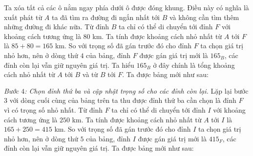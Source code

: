 \begin{multicols}{2}
	\vskip 0.1cm
	Ta xóa tất cả các ô nằm ngay phía dưới ô được đóng khung. Điều này có nghĩa là xuất phát từ $A$ ta đã tìm ra đường đi ngắn nhất tới $B$ và không cần tìm thêm những đường đi khác nữa. 
	\vskip 0.1cm
	Từ đỉnh $B$ ta chỉ có thể di chuyển tới đỉnh $F$ với khoảng cách tương ứng là $80$ km. Ta tính được khoảng cách nhỏ nhất từ $A$ tới $F$ là $85+80=165$ km. So với trọng số đã gán trước đó cho đỉnh $F$ ta chọn giá trị nhỏ hơn, nên ở dòng thứ $4$ của bảng, đỉnh $F$ được gán giá trị mới là $165_B$, các đỉnh còn lại vẫn giữ nguyên giá trị. Ta hiểu $165_B$ ở đây chính là tổng khoảng cách nhỏ nhất từ $A$ tới $B$ và từ $B$ tới $F$.
	\vskip 0.1cm 
	Ta được bảng mới như sau: 
	\begin{table}[H]
		\vspace*{-5pt}
		\centering
		\captionsetup{labelformat= empty, justification=centering}
		\vspace*{-10pt}
	\end{table}
	\textit{Bước $4$: Chọn đỉnh thứ ba và cập nhật trọng số cho các đỉnh còn lại.}  Lặp lại bước $3$ với dòng cuối cùng của bảng trên ta thu được đỉnh thứ ba cần chọn là đỉnh $F$ vì có trọng số nhỏ nhất. Từ đỉnh $F$ ta chỉ có thể di chuyển tới đỉnh $I$ với khoảng cách tương ứng là $250$ km. Ta tính được khoảng cách nhỏ nhất từ $A$ tới $I$ là $165+250=415$ km. So với trọng số đã gán trước đó cho đỉnh $I$ ta chọn giá trị nhỏ hơn, nên ở dòng thứ $5$ của bảng, đỉnh $I$ được gán giá trị mới là $415_F$, các đỉnh còn lại vẫn giữ nguyên giá trị. 
	\vskip 0.1cm
	Ta được bảng mới như sau: 
	\begin{table}[H]
		\vspace*{-5pt}
		\centering
		\captionsetup{labelformat= empty, justification=centering}
\end{table}
\end{multicols}
